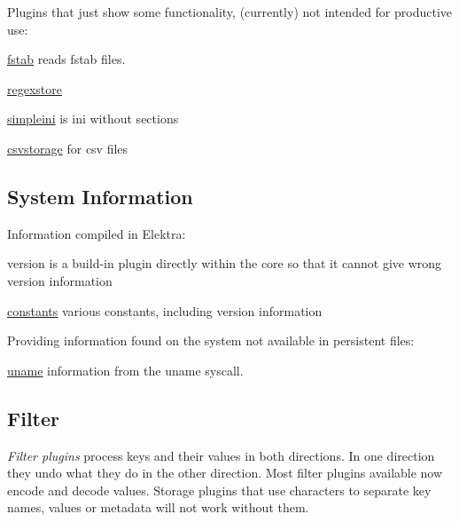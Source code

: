 Plugins that just show some functionality, (currently) not intended for productive use\+:


\begin{DoxyItemize}
\item \hyperlink{md_src_plugins_fstab_README_src_plugins_fstab_README_md}{fstab} reads fstab files.
\item \hyperlink{md_src_plugins_regexstore_README_src_plugins_regexstore_README_md}{regexstore}
\item \hyperlink{md_src_plugins_simpleini_README_src_plugins_simpleini_README_md}{simpleini} is ini without sections
\item \hyperlink{md_src_plugins_csvstorage_README_src_plugins_csvstorage_README_md}{csvstorage} for csv files
\end{DoxyItemize}

\subsection*{System Information}

Information compiled in Elektra\+:
\begin{DoxyItemize}
\item version is a build-\/in plugin directly within the core so that it cannot give wrong version information
\item \hyperlink{md_src_plugins_constants_README_src_plugins_constants_README_md}{constants} various constants, including version information
\end{DoxyItemize}

Providing information found on the system not available in persistent files\+:


\begin{DoxyItemize}
\item \hyperlink{md_src_plugins_uname_README_src_plugins_uname_README_md}{uname} information from the uname syscall.
\end{DoxyItemize}

\subsection*{Filter}

{\itshape Filter plugins} process keys and their values in both directions. In one direction they undo what they do in the other direction. Most filter plugins available now encode and decode values. Storage plugins that use characters to separate key names, values or metadata will not work without them.

